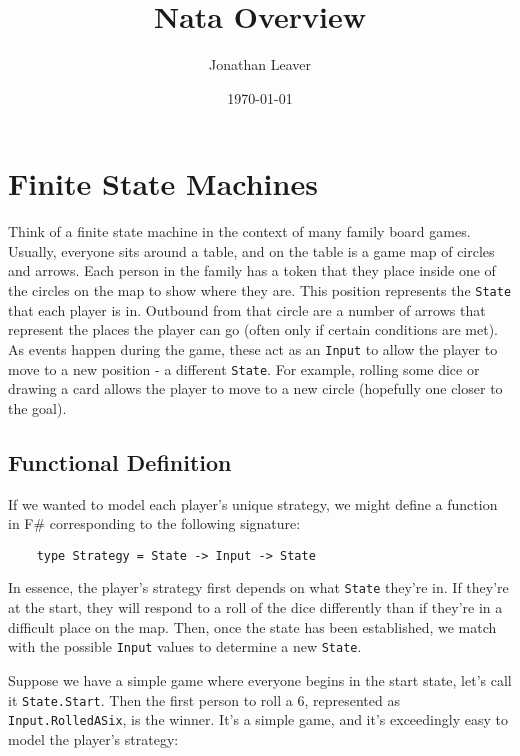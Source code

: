 \documentclass{article}
\begin{document}
\title{Nata Overview}
\author{Jonathan Leaver}
\date{\today}

\maketitle
\thispagestyle{empty}
\tableofcontents

\clearpage
{}


\clearpage
\section{Finite State Machines}

Think of a finite state machine in the context of many family board games.  Usually, everyone sits around a table, and on the table is a game map of circles and arrows.  Each person in the family has a token that they place inside one of the circles on the map to show where they are.  This position represents the \texttt{State} that each player is in.  Outbound from that circle are a number of arrows that represent the places the player can go (often only if certain conditions are met).  As events happen during the game, these act as an \texttt{Input} to allow the player to move to a new position - a different \texttt{State}.  For example, rolling some dice or drawing a card allows the player to move to a new circle (hopefully one closer to the goal).

\subsection{Functional Definition}

If we wanted to model each player's unique strategy, we might define a function in F\# corresponding to the following signature:

\begin{verbatim}
    type Strategy = State -> Input -> State
\end{verbatim}

In essence, the player's strategy first depends on what \texttt{State} they're in.  If they're at the start, they will respond to a roll of the dice differently than if they're in a difficult place on the map. Then, once the state has been established, we match with the possible \texttt{Input} values to determine a new \texttt{State}.

Suppose we have a simple game where everyone begins in the start state, let's call it \texttt{State.Start}.  Then the first person to roll a 6, represented as \texttt{Input.RolledASix}, is the winner.  It's a simple game, and it's exceedingly easy to model the player's strategy:
\end{document}
